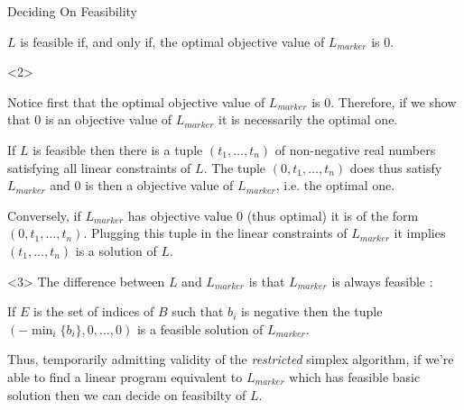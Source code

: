 \documentclass[32pt, aspectratio = 169]{beamer}
\begin{document}
\begin{frame}{Deciding On Feasibility}
    \begin{prop}
        $L$ is feasible if, and only if, the optimal objective value of $L_{marker}$ is $0$.
    \end{prop}
    \begin{overlayarea}{\textwidth}{.8\textheight}
        \vspace{.2\baselineskip}
    \begin{onlyenv}<2>
        \setlength\columnseprule{.1pt}
        \begin{multicols}{2}
        \begin{demo}
            Notice first that the optimal objective value of $L_{marker}$ is $0$. Therefore, if we show that $0$ is an objective value of $L_{marker}$ it is necessarily the optimal one.

            If $L$ is feasible then there is a tuple $(t_1, \ldots, t_n)$ of non-negative real numbers satisfying all linear constraints of $L$. The tuple $(0, t_1, \ldots, t_n)$ does thus satisfy $L_{marker}$ and $0$ is then a objective value of $L_{marker}$, i.e. the optimal one.

            Conversely, if $L_{marker}$ has objective value $0$ (thus optimal) it is of the form $(0, t_1, \ldots, t_n)$. Plugging this tuple in the linear constraints of $L_{marker}$ it implies $(t_1, \ldots, t_n)$ is a solution of $L$.
        \end{demo}
    \end{multicols}
    \end{onlyenv}
    \begin{onlyenv}<3>
    The difference between $L$ and $L_{marker}$ is that $L_{marker}$ is always feasible :
        \begin{center}
        \begin{minipage}{.8\textwidth}
        \begin{tcolorbox}[
                enhanced,
                parbox = true,
                colback = mLightBrown!30!white,
                colframe = mLightBrown!30!white,
                arc = 0mm,
                ]
            If $E$ is the set of indices of $B$ such that $b_i$ is negative then the tuple $(-\min_i\{b_i\}, 0, \ldots, 0)$ is a feasible solution of $L_{marker}$.
        \end{tcolorbox}
        \end{minipage}
        \end{center}
        Thus, temporarily admitting validity of the \textit{restricted} simplex algorithm, if we're able to find a linear program equivalent to $L_{marker}$ which has \alert{feasible basic solution} then we can decide on feasibilty of $L$.
    \end{onlyenv}
    \end{overlayarea}
\end{frame}
\end{document}
